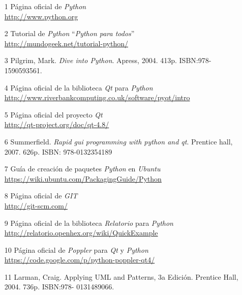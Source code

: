 

\begin{itemize}
\item[1] Página oficial de \textit{Python}\\
\url{http://www.python.org}
\item[2] Tutorial de \textit{Python} ``\textit{Python para todos}''\\
\url{http://mundogeek.net/tutorial-python/}
\item[3] Pilgrim, Mark. \textit{Dive into Python}. Apress, 2004. 413p. ISBN:978-1590593561.
\item[4] Página oficial de la biblioteca \textit{Qt} para \textit{Python}\\
\url{http://www.riverbankcomputing.co.uk/software/pyqt/intro}
\item[5] Página oficial del proyecto \textit{Qt}\\
\url{http://qt-project.org/doc/qt-4.8/}
\item[6] Summerfield. \textit{Rapid gui programming with python and qt}. Prentice hall, 2007. 626p. ISBN: 978-0132354189
\item[7]Guía de creación de paquetes \textit{Python} en \textit{Ubuntu}\\
\url{https://wiki.ubuntu.com/PackagingGuide/Python}
\item[8] Página oficial de \textit{GIT}\\
\url{http://git-scm.com/}
\item[9] Página oficial de la biblioteca \textit{Relatorio} para \textit{Python}\\
\url{http://relatorio.openhex.org/wiki/QuickExample}
\item[10] Página oficial de \textit{Poppler} para \textit{Qt} y \textit{Python}\\
\url{https://code.google.com/p/python-poppler-qt4/}
\item[11] Larman, Craig. Applying UML and Patterns, 3a Edición. Prentice Hall, 2004. 736p. ISBN:978-
0131489066.
\end{itemize}
